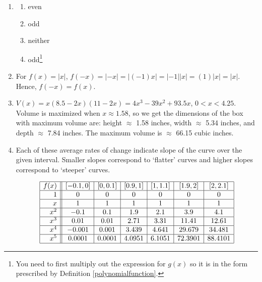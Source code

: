 \documentclass{ximera}
\begin{document}
\begin{enumerate}
\setcounter{enumi}{\value{HW}}

\addtocounter{enumi}{1}

\item  \begin{multicols}{4}
\begin{enumerate}

\item even

\item  odd

\item  neither

\item  odd\footnote{You need to first multiply out the expression for $g(x)$ so it is in the form prescribed by Definition \ref{polynomialfunction}.}

\end{enumerate}

\end{multicols}

\item For $f(x) = |x|$, $f(-x) = |-x| = |(-1) x|  = |-1| |x| = (1) |x| = |x|$.  Hence, $f(-x) = f(x)$.

\item  $V(x) = x(8.5-2x)(11-2x) = 4x^3-39x^2+93.5x$, $0 < x < 4.25$.  Volume is maximized when $x \approx 1.58$, so we get the dimensions of the box with maximum volume are: height $\approx$ 1.58 inches, width $\approx$ 5.34 inches, and depth $\approx$ 7.84 inches.  The maximum volume is $\approx$ 66.15 cubic inches.

\item  Each of these average rates of change indicate slope of the curve over the given interval.  Smaller slopes correspond to `flatter' curves and higher slopes correspond to `steeper' curves.

\[ \begin{array}{|r||c|c|c|c|c|c|}  \hline

 f(x) &  [-0.1, 0] & [0, 0.1] &[0.9, 1] & [1, 1.1] & [1.9, 2] & [2, 2.1]  \\ \hline
 1 &  0 &   0  & 0   & 0   & 0  & 0 \\  \hline
 x &  1 &   1  & 1   & 1   & 1  & 1 \\  \hline
 x^2 & -0.1 & 0.1 & 1.9 & 2.1 & 3.9 & 4.1  \\  \hline
 x^3 & 0.01  & 0.01 & 2.71 & 3.31 & 11.41 & 12.61 \\  \hline
 x^4&  -0.001 & 0.001 & 3.439 & 4.641 & 29.679 & 34.481 \\ \hline
 x^5 & 0.0001 & 0.0001 & 4.0951 & 6.1051 & 72.3901 & 88.4101 \\ \hline


\end{array}\]
\end{enumerate}
\end{document}
